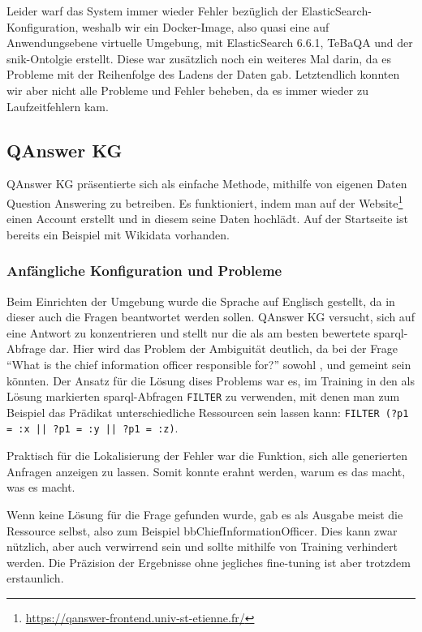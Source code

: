 Leider warf das System immer wieder Fehler bezüglich der ElasticSearch-Konfiguration, weshalb wir ein Docker-Image,
also quasi eine auf Anwendungsebene virtuelle Umgebung, mit ElasticSearch 6.6.1, TeBaQA und der \ac{snik}-Ontolgie erstellt.
Diese war zusätzlich noch ein weiteres Mal darin, da es Probleme mit der Reihenfolge des Ladens der Daten gab.
Letztendlich konnten wir aber nicht alle Probleme und Fehler beheben, da es immer wieder zu Laufzeitfehlern kam.

\subsection{QAnswer KG}

QAnswer KG präsentierte sich als einfache Methode, mithilfe von eigenen Daten Question Answering zu betreiben.
Es funktioniert, indem man auf der Website\footnote{\url{https://qanswer-frontend.univ-st-etienne.fr/}} einen Account erstellt und in diesem seine Daten hochlädt.
Auf der Startseite ist bereits ein Beispiel mit Wikidata vorhanden.

\subsubsection{Anfängliche Konfiguration und Probleme}

Beim Einrichten der Umgebung wurde die Sprache auf Englisch gestellt, da in dieser auch die Fragen beantwortet werden sollen.
QAnswer KG versucht, sich auf eine Antwort zu konzentrieren und stellt nur die als am besten bewertete \ac{sparql}-Abfrage dar.
Hier wird das Problem der Ambiguität deutlich, da bei der Frage \enquote{What is the chief information officer responsible for?} sowohl
,  und  gemeint sein könnten.
Der Ansatz für die Lösung dises Problems war es, im Training in den als Lösung markierten \ac{sparql}-Abfragen \texttt{FILTER} zu verwenden,
mit denen man zum Beispiel das Prädikat unterschiedliche Ressourcen sein lassen kann: \texttt{FILTER (?p1 = :x || ?p1 = :y || ?p1 = :z)}.

Praktisch für die Lokalisierung der Fehler war die Funktion, sich alle generierten Anfragen anzeigen zu lassen.
Somit konnte erahnt werden, warum es das macht, was es macht.

Wenn keine Lösung für die Frage gefunden wurde, gab es als Ausgabe meist die Ressource selbst, also zum Beispiel \ac{bb}{ChiefInformationOfficer}.
Dies kann zwar nützlich, aber auch verwirrend sein und sollte mithilfe von Training verhindert werden.
Die Präzision der Ergebnisse ohne jegliches fine-tuning ist aber trotzdem erstaunlich.

